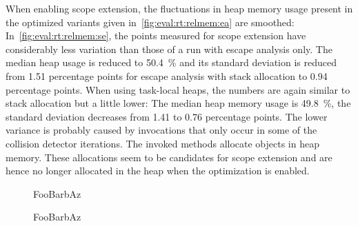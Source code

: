 		When enabling scope extension, the fluctuations in heap memory usage present in the optimized variants given
		in~\cref{fig:eval:rt:relmem:ea} are smoothed: In~\cref{fig:eval:rt:relmem:se}, the points measured for scope
		extension have considerably less variation than those of a run with escape analysis only. The median heap usage is
		reduced to 50.4~\% and its standard deviation is reduced from 1.51 percentage points for escape analysis with stack
		allocation to 0.94 percentage points. When using task-local heaps, the numbers are again similar to stack allocation
		but a little lower: The median heap memory usage is 49.8~\%, the standard deviation decreases from 1.41 to 0.76
		percentage points. The lower variance is probably caused by invocations that only occur in some of the collision
		detector iterations. The invoked methods allocate objects in heap memory. These allocations seem to be candidates
		for scope extension and are hence no longer allocated in the heap when the optimization is enabled.

		\begin{figure}
			\centering
			

			\caption[Relative runtime of \emph{on-the-go} CD\textsubscript{j} with escape analysis]{%
				FooBarbAz}
			\label{fig:eval:rt:time:ea}
		\end{figure}

		\begin{figure}
			\centering
			

			\caption[Relative runtime of \emph{on-the-go} CD\textsubscript{j} with scope extension]{%
				FooBarbAz}
			\label{fig:eval:rt:time:se}
		\end{figure}

